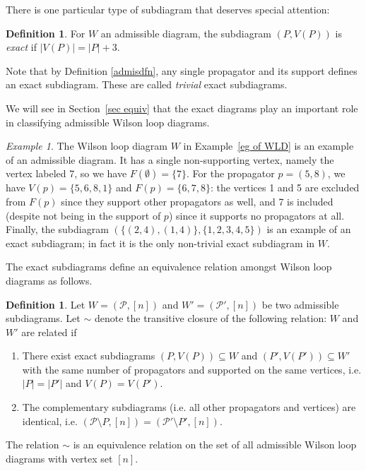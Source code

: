 \documentclass[11pt]{article}
\newcommand{\cP}{\mathcal{P}}
\theoremstyle{remark}
\newtheorem{eg}[thm]{Example}
\theoremstyle{definition}
\newtheorem{dfn}[thm]{Definition}
\begin{document}
There is one particular type of subdiagram that deserves special attention:

\begin{dfn}\label{def:exact diagram}
For $W$ an admissible diagram, the subdiagram $(P, V(P))$ is {\em exact} if $|V(P)| = |P| + 3$.
\end{dfn}

Note that by Definition \ref{admisdfn}, any single propagator and its support defines an exact subdiagram. These are called \emph{trivial} exact subdiagrams.

We will see in Section~\ref{sec equiv} that the exact diagrams play an important role in classifying admissible Wilson loop diagrams.

\vspace{3pt}
\begin{eg}
The Wilson loop diagram $W$ in Example~\ref{eg of WLD} is an example of an admissible diagram. It has a single non-supporting vertex, namely the vertex labeled 7, so we have $F(\emptyset) = \{7\}$. For the propagator $p = (5, 8)$, we have $V(p) = \{5,6,8,1\}$ and $F(p) = \{6, 7,8\}$: the vertices 1 and 5 are excluded from $F(p)$ since they support other propagators as well, and 7 is included (despite not being in the support of $p$) since it supports no propagators at all. Finally, the subdiagram $(\{(2, 4), (1, 4)\}, \{1, 2, 3, 4, 5\})$ is an example of an exact subdiagram; in fact it is the only non-trivial exact subdiagram in $W$.
\end{eg}

The exact subdiagrams define an equivalence relation amongst Wilson loop diagrams as follows.

\begin{dfn}\label{equivdfn} 
Let $W = (\cP,[n])$ and $W' = (\cP',[n])$ be two admissible subdiagrams. Let $\sim$ denote the transitive closure of the following relation: $W$ and $W'$ are related if
\begin{enumerate}
\item There exist exact subdiagrams $(P, V(P)) \subseteq W$ and $(P', V(P')) \subseteq W'$ with the same number of propagators and supported on the same vertices, i.e. $|P| = |P'|$ and  $V(P) =  V(P')$.
\item The complementary subdiagrams (i.e. all other propagators and vertices) are identical, i.e. $(\cP \setminus P, [n]) = (\cP' \setminus P', [n])$.
\end{enumerate}
The relation $\sim$ is an equivalence relation on the set of all admissible Wilson loop diagrams with vertex set $[n]$.
\end{dfn}
\end{document}
